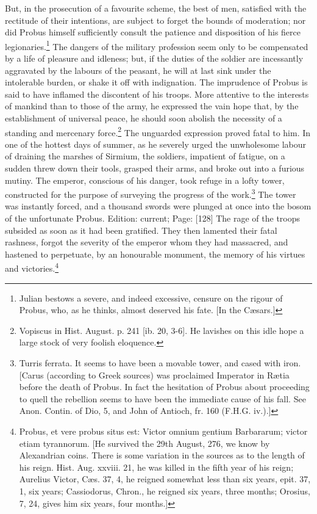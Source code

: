 But, in the prosecution of a favourite scheme, the best of men, satisfied with the rectitude of their intentions, are subject to forget the bounds of moderation; nor did Probus himself sufficiently consult the patience and disposition of his fierce legionaries.\footnote{Julian bestows a severe, and indeed excessive, censure on the rigour of Probus, who, as he thinks, almost deserved his fate. [In the Cæsars.]} The dangers of the military profession seem only to be compensated by a life of pleasure and idleness; but, if the duties of the soldier are incessantly aggravated by the labours of the peasant, he will at last sink under the intolerable burden, or shake it off with indignation. The imprudence of Probus is said to have inflamed the discontent of his troops. More attentive to the interests of mankind than to those of the army, he expressed the vain hope that, by the establishment of universal peace, he should soon abolish the necessity of a standing and mercenary force.\footnote{Vopiscus in Hist. August. p. 241 [ib. 20, 3-6]. He lavishes on this idle hope a large stock of very foolish eloquence.} The unguarded expression proved fatal to him. In one of the hottest days of summer, as he severely urged the unwholesome labour of draining the marshes of Sirmium, the soldiers, impatient of fatigue, on a sudden threw down their tools, grasped their arms, and broke out into a furious mutiny. The emperor, conscious of his danger, took refuge in a lofty tower, constructed for the purpose of surveying the progress of the work.\footnote{Turris ferrata. It seems to have been a movable tower, and cased with iron. [Carus (according to Greek sources) was proclaimed Imperator in Rætia before the death of Probus. In fact the hesitation of Probus about proceeding to quell the rebellion seems to have been the immediate cause of his fall. See Anon. Contin. of Dio, 5, and John of Antioch, fr. 160 (F.H.G. iv.).]} The tower was instantly forced, and a thousand swords were plunged at once into the bosom of the unfortunate Probus. Edition: current; Page: [128] The rage of the troops subsided as soon as it had been gratified. They then lamented their fatal rashness, forgot the severity of the emperor whom they had massacred, and hastened to perpetuate, by an honourable monument, the memory of his virtues and victories.\footnote{Probus, et vere probus situs est: Victor omnium gentium Barbararum; victor etiam tyrannorum. [He survived the 29th August, 276, we know by Alexandrian coins. There is some variation in the sources as to the length of his reign. Hist. Aug. xxviii. 21, he was killed in the fifth year of his reign; Aurelius Victor, Cæs. 37, 4, he reigned somewhat less than six years, epit. 37, 1, six years; Cassiodorus, Chron., he reigned six years, three months; Orosius, 7, 24, gives him six years, four months.]}

